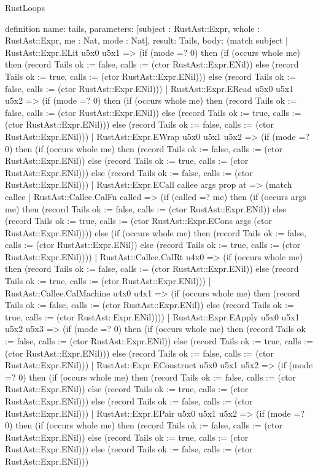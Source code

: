 \begin{lexlean}{RustLoops}
\begin{semanticmodule}
definition{
  name: tails,
  parameters: [subject : RustAst::Expr, whole : RustAst::Expr, me : Nat, mode : Nat],
  result: Tails,
  body: (match subject
    | RustAst::Expr.ELit u5x0 u5x1 => (if (mode =? 0) then (if (occurs whole me) then (record Tails {ok := false, calls := (ctor RustAst::Expr.ENil)}) else (record Tails {ok := true, calls := (ctor RustAst::Expr.ENil)})) else (record Tails {ok := false, calls := (ctor RustAst::Expr.ENil)}))
    | RustAst::Expr.ERead u5x0 u5x1 u5x2 => (if (mode =? 0) then (if (occurs whole me) then (record Tails {ok := false, calls := (ctor RustAst::Expr.ENil)}) else (record Tails {ok := true, calls := (ctor RustAst::Expr.ENil)})) else (record Tails {ok := false, calls := (ctor RustAst::Expr.ENil)}))
    | RustAst::Expr.EWrap u5x0 u5x1 u5x2 => (if (mode =? 0) then (if (occurs whole me) then (record Tails {ok := false, calls := (ctor RustAst::Expr.ENil)}) else (record Tails {ok := true, calls := (ctor RustAst::Expr.ENil)})) else (record Tails {ok := false, calls := (ctor RustAst::Expr.ENil)}))
    | RustAst::Expr.ECall callee args prop at => (match callee
      | RustAst::Callee.CalFn called => (if (called =? me) then (if (occurs args me) then (record Tails {ok := false, calls := (ctor RustAst::Expr.ENil)}) else (record Tails {ok := true, calls := (ctor RustAst::Expr.ECons args (ctor RustAst::Expr.ENil))})) else (if (occurs whole me) then (record Tails {ok := false, calls := (ctor RustAst::Expr.ENil)}) else (record Tails {ok := true, calls := (ctor RustAst::Expr.ENil)})))
      | RustAst::Callee.CalRt u4x0 => (if (occurs whole me) then (record Tails {ok := false, calls := (ctor RustAst::Expr.ENil)}) else (record Tails {ok := true, calls := (ctor RustAst::Expr.ENil)}))
      | RustAst::Callee.CalMachine u4x0 u4x1 => (if (occurs whole me) then (record Tails {ok := false, calls := (ctor RustAst::Expr.ENil)}) else (record Tails {ok := true, calls := (ctor RustAst::Expr.ENil)})))
    | RustAst::Expr.EApply u5x0 u5x1 u5x2 u5x3 => (if (mode =? 0) then (if (occurs whole me) then (record Tails {ok := false, calls := (ctor RustAst::Expr.ENil)}) else (record Tails {ok := true, calls := (ctor RustAst::Expr.ENil)})) else (record Tails {ok := false, calls := (ctor RustAst::Expr.ENil)}))
    | RustAst::Expr.EConstruct u5x0 u5x1 u5x2 => (if (mode =? 0) then (if (occurs whole me) then (record Tails {ok := false, calls := (ctor RustAst::Expr.ENil)}) else (record Tails {ok := true, calls := (ctor RustAst::Expr.ENil)})) else (record Tails {ok := false, calls := (ctor RustAst::Expr.ENil)}))
    | RustAst::Expr.EPair u5x0 u5x1 u5x2 => (if (mode =? 0) then (if (occurs whole me) then (record Tails {ok := false, calls := (ctor RustAst::Expr.ENil)}) else (record Tails {ok := true, calls := (ctor RustAst::Expr.ENil)})) else (record Tails {ok := false, calls := (ctor RustAst::Expr.ENil)}))
}
\end{semanticmodule}
\end{lexlean}

